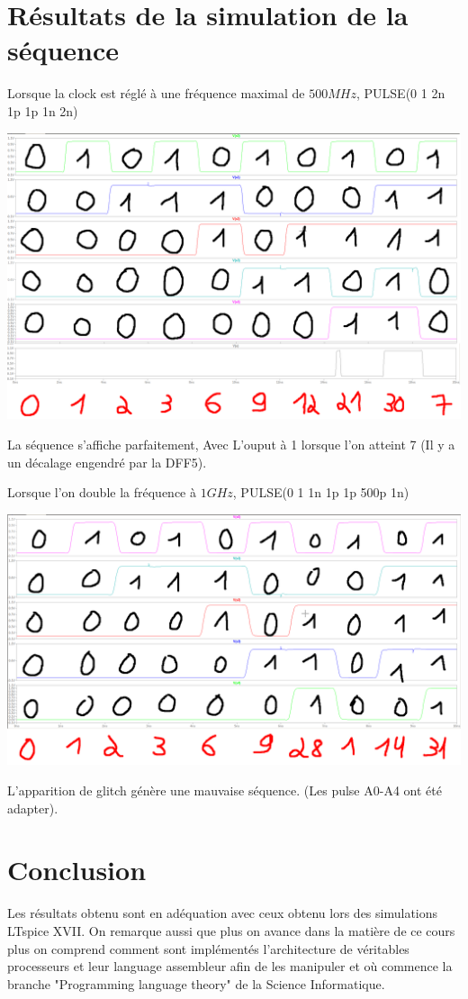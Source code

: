 \documentclass{homeworg}
\begin{document}
\section{Résultats de la simulation de la séquence}
    Lorsque la clock est réglé à une fréquence maximal de $500 MHz$, PULSE(0 1 2n 1p 1p 1n 2n)
    \begin{center}
        \includegraphics[scale=0.25]{count.png}
    \end{center}
    La séquence s'affiche parfaitement, Avec L'ouput à 1 lorsque l'on atteint 7 (Il y a un décalage engendré par la DFF5).
    
    Lorsque l'on double la fréquence à $1 GHz$, PULSE(0 1 1n 1p 1p 500p 1n)
    \begin{center}
        \includegraphics[scale=0.25]{count_bug.png}
    \end{center}
    L'apparition de glitch génère une mauvaise séquence. (Les pulse A0-A4 ont été adapter).
\section{Conclusion}
Les résultats obtenu sont en adéquation avec ceux obtenu lors des simulations LTspice XVII.
On remarque aussi que plus on avance dans la matière de ce cours plus on comprend comment sont implémentés l'architecture de véritables processeurs et leur language assembleur afin de les manipuler et où commence la branche "Programming language theory" de la Science Informatique.
\end{document}
